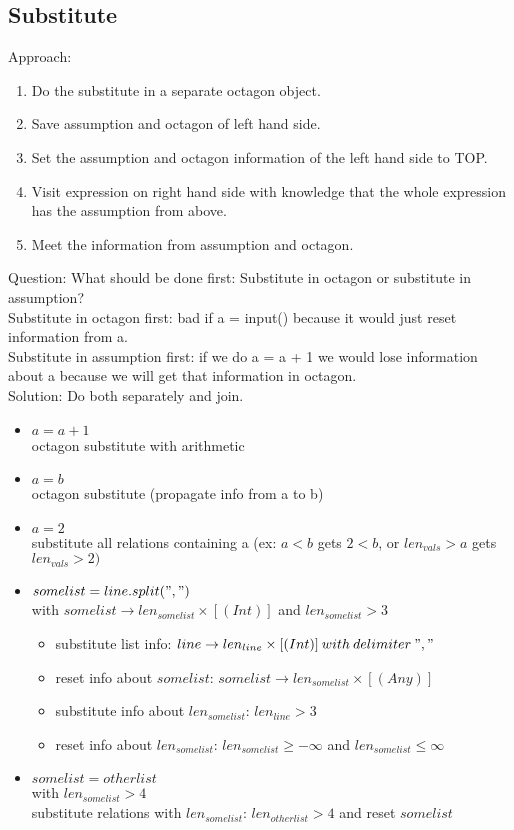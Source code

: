 \documentclass[11pt]{article}
\begin{document}
\subsection{Substitute}

Approach:
\begin{enumerate}
  \item Do the substitute in a separate octagon object.
  \item Save assumption and octagon of left hand side.
  \item Set the assumption and octagon information of the left hand side to TOP.
  \item Visit expression on right hand side with knowledge that the whole expression has the assumption from above.
  \item Meet the information from assumption and octagon.
\end{enumerate}

Question: What should be done first: Substitute in octagon or substitute in assumption?\\
Substitute in octagon first: bad if a = input() because it would just reset information from a.\\
Substitute in assumption first: if we do a = a + 1 we would lose information about a because we will get that information in octagon.\\
Solution: Do both separately and join.

\begin{itemize}
  \item $a = a + 1$\\
  octagon substitute with arithmetic
  \item $a = b$\\
  octagon substitute (propagate info from a to b)
  \item $a = 2$\\
  substitute all relations containing a (ex: $a < b$ gets $2 < b$, or $len_{vals} > a$ gets $len_{vals} > 2)$
  \item $somelist = line.split(",")$\\ with $somelist \rightarrow len_{somelist} \times [(Int)]$ and $len_{somelist} > 3$
  \begin{itemize}
    \item substitute list info: $line \rightarrow len_{line} \times [(Int)]\:with\:delimiter\:","$ 
    \item reset info about $somelist$: $somelist \rightarrow len_{somelist} \times [(Any)]$
    \item substitute info about $len_{somelist}$: $len_{line} > 3$
    \item reset info about $len_{somelist}$: $len_{somelist} \geq -\infty$ and $len_{somelist} \leq \infty$
  \end{itemize}
  \item $somelist = otherlist$\\ with $len_{somelist} > 4$\\
  substitute relations with $len_{somelist}$: $len_{otherlist} > 4$ and reset $somelist$
\end{itemize}
\end{document}
